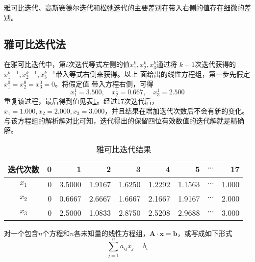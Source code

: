 雅可比迭代、高斯赛德尔迭代和松弛迭代的主要差别在带入右侧的值存在细微的差别。

\subsection{雅可比迭代法}
在雅可比迭代中，第$i$次迭代等式左侧的值$x_{1}^{k}, x_{2}^{k},x_{3}^{k}$通过将
$k-1$次迭代获得的$x_{1}^{k-1}, x_{2}^{k-1},x_{3}^{k-1}$带入等式右侧来获得。以上
面给出的线性方程组，第一步先假定$x_{1}^{0} = x_{2}^{0} = x_{3}^{0}=0$。将假定值
带入方程右侧，可得
\begin{equation*}
x_{1}^{1}=3.500,\quad x_{2}^{1}=0.667,\quad x_{3}^{1}=2.500
\end{equation*}
重复该过程，最后得到值见表\ref{TbLA_Jacobi_result}。经过17次迭代后，
$x_{1}=1.000,x_{2}=2.000,x_{3}=3.000$，并且结果在增加迭代次数后不会有新的变化。
与该方程组的解析解对比可知，迭代得出的保留四位有效数值的迭代解就是精确解。
\begin{table}[!ht]
  \begin{center}
  \caption{雅可比迭代结果}
  \label{TbLA_Jacobi_result}
  \begin{tabular}{|c|r|r|r|r|r|r|r|r|}
    \hline
    迭代次数 & 0 & 1 & 2 & 3 & 4 & 5 & $\cdots$ & 17 \\
    \hline
    $x_{1}$ & 0 & 3.5000 & 1.9167 & 1.6250 & 1.2292 & 1.1563 & $\cdots$ & 1.000
    \\
    \hline
    $x_{2}$ & 0 & 0.6667 & 2.6667 & 1.6667 & 2.1667 & 1.9167 & $\cdots$ & 2.000
    \\
    \hline
    $x_{3}$ & 0 & 2.5000 & 1.0833 & 2.8750 & 2.5208 & 2.9688 & $\cdots$ & 3.000
    \\
    \hline
  \end{tabular}
  \end{center}
\end{table}

对一个包含$n$个方程和$n$各未知量的线性方程组，$\mathbf{A}\cdot \mathbf{x} =
\mathbf{b}$，或写成如下形式
\begin{equation}
  \sum_{j=1}^{n}a_{ij}x_{j} = b_{i}
\end{equation}

